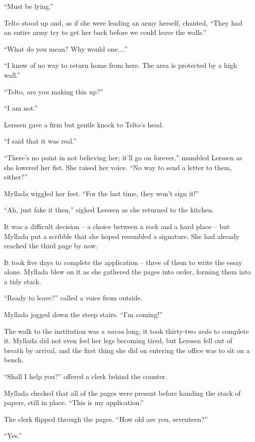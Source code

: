 ``Must be lying.''

Telto stood up and, as if she were leading an army herself, chanted, ``They had an entire army try to get her back before we could leave the walls.''

``What do you mean? Why would one....''

``I know of no way to return home from here. The area is protected by a high wall.''

``Telto, are you making this up?''

``I am not.''

Lerssen gave a firm but gentle knock to Telto's head.

``I said that it was real.''

``There's no point in not believing her; it'll go on forever,'' mumbled Lerssen as she lowered her fist. She raised her voice. ``No way to send a letter to them, either?''

Myllada wiggled her feet. ``For the last time, they won't sign it!''

``Ah, just fake it then,'' sighed Lerssen as she returned to the kitchen.

It was a difficult decision -- a choice between a rock and a hard place -- but Myllada put a scribble that she hoped resembled a signature. She had already reached the third page by now.

\centeredstars

It took five days to complete the application -- three of them to write the essay alone. Myllada blew on it as she gathered the pages into order, forming them into a tidy stack.

``Ready to leave?'' called a voice from outside.

Myllada jogged down the steep stairs. ``I'm coming!''

The walk to the institution was a \emph{navsa} long; it took thirty-two \emph{aedo} to complete it. Myllada did not even feel her legs becoming tired, but Lerssen fell out of breath by arrival, and the first thing she did on entering the office was to sit on a bench.

``Shall I help you?'' offered a clerk behind the counter.

Myllada checked that all of the pages were present before handing the stack of papers, still in place. ``This is my application.''

The clerk flipped through the pages. ``How old are you, seventeen?''

``Yes.''

